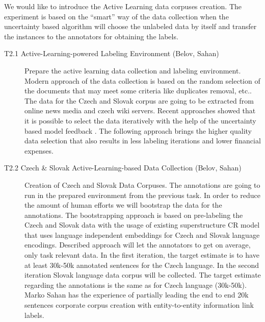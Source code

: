We would like to introduce the Active Learning data corpuses creation. The experiment is based on the “smart” way of the data collection when the uncertainty based algorithm will choose the unlabeled data by itself and transfer the instances to the annotators for obtaining the labels. 

\begin{description}
	\item [T2.1 Active-Learning-powered Labeling Environment (Belov, Sahan)] Prepare the active learning data collection and labeling environment.
Modern approach of the data collection is based on the random selection of the documents that may meet some criteria like duplicates removal, etc.. The data for the Czech and Slovak corpus are going to be extracted from online news media and czech wiki servers. Recent approaches showed that it is possible to select the data iteratively with the help of the uncertainty based model feedback \cite{gal2017deep, lowell2018practical}. The following approach brings the higher quality data selection that also results in less labeling iterations and lower financial expenses.

	\item [T2.2 Czech \& Slovak Active-Learning-based Data Collection (Belov, Sahan)] Creation of Czech and Slovak Data Corpuses. The annotations are going to run in the prepared environment from the previous task. In order to reduce the amount of human efforts we will bootstrap the data for the annotations. The bootstrapping approach is based on pre-labeling the Czech and Slovak data with the usage of existing superstructure CR model that uses language independent embeddings for Czech and Slovak language encodings. Described approach will let the annotators to get on average, only task relevant data.
In the first iteration, the target estimate is to have at least 30k-50k annotated sentences for the Czech language. In the second iteration Slovak language data corpus will be collected. The target estimate regarding the annotations is the same as for Czech language (30k-50k). Marko Sahan has the experience of partially leading the end to end 20k sentences corporate corpus creation with entity-to-entity information link labels.  


\end{description}
